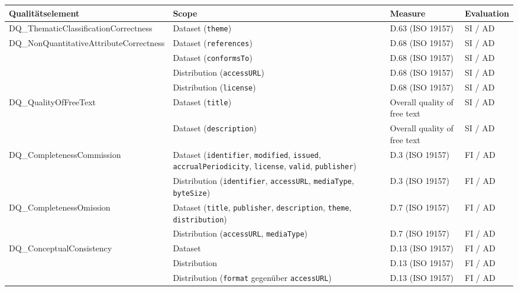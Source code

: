 \captionsetup[table]{justification=centering}

{
\renewcommand{\arraystretch}{0.9}
\centering
\begin{table}[h!]
\tiny
\centering
\begin{tabular}{|p{4.2cm}|p{4.9cm}|p{2.0cm}|p{1.3cm}|}
\hline
\textbf{Qualitätselement} & \textbf{Scope} & \textbf{Measure} & \textbf{Evaluation} \\
\hline

DQ\_ThematicClassificationCorrectness
& Dataset (\texttt{theme})
& D.63 (ISO 19157)
& SI / AD \\
\hline

DQ\_NonQuantitativeAttributeCorrectness
& Dataset (\texttt{references})
& D.68 (ISO 19157)
& SI / AD \\ \cline{2-4}
& Dataset (\texttt{conformsTo})
& D.68 (ISO 19157)
& SI / AD \\ \cline{2-4}
& Distribution (\texttt{accessURL})
& D.68 (ISO 19157)
& SI / AD \\ \cline{2-4}
& Distribution (\texttt{license})
& D.68 (ISO 19157)
& SI / AD \\
\hline

DQ\_QualityOfFreeText
& Dataset (\texttt{title})
& Overall quality of free text
& SI / AD \\ \cline{2-4}
& Dataset (\texttt{description})
& Overall quality of free text
& SI / AD \\
\hline

DQ\_CompletenessCommission
& Dataset (\texttt{identifier}, \texttt{modified}, \texttt{issued}, \texttt{accrualPeriodicity}, \texttt{license}, \texttt{valid}, \texttt{publisher})
& D.3 (ISO 19157)
& FI / AD \\ \cline{2-4}
& Distribution (\texttt{identifier}, \texttt{accessURL}, \texttt{mediaType}, \texttt{byteSize})
& D.3 (ISO 19157)
& FI / AD \\
\hline

DQ\_CompletenessOmission
& Dataset (\texttt{title}, \texttt{publisher}, \texttt{description}, \texttt{theme}, \texttt{distribution})
& D.7 (ISO 19157)
& FI / AD \\ \cline{2-4}
& Distribution (\texttt{accessURL}, \texttt{mediaType})
& D.7 (ISO 19157)
& FI / AD \\
\hline

DQ\_ConceptualConsistency
& Dataset
& D.13 (ISO 19157)
& FI / AD \\ \cline{2-4}
& Distribution
& D.13 (ISO 19157)
& FI / AD \\ \cline{2-4}
& Distribution (\texttt{format} gegenüber \texttt{accessURL})
& D.13 (ISO 19157)
& FI / AD \\
\hline


\end{tabular}
\end{table}}
